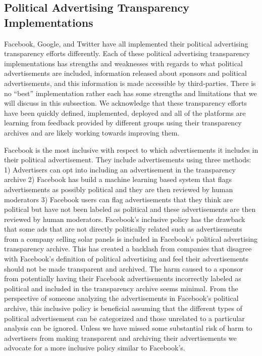 \documentclass[fleqn,10pt]{wlscirep}
\begin{document}
\subsection*{Political Advertising Transparency Implementations}

Facebook, Google, and Twitter have all implemented their political advertising transparency efforts differently. Each of these political advertising transparency implementations has strengths and weaknesses with regards to what political advertisements are included, information released about sponsors and political advertisements, and this information is made accessible by third-parties. There is no ``best'' implementation rather each has some strengths and limitations that we will discuss in this subsection. We acknowledge that these transparency efforts have been quickly defined, implemented, deployed and all of the platforms are learning from feedback provided by different groups using their transparency archives and are likely working towards improving them.

Facebook is the most inclusive with respect to which advertisements it includes in their political advertisement. They include advertisements using three methods: 1) Advertisers can opt into including an advertisement in the transparency archive 2) Facebook has build a machine learning based system that flags advertisements as possibly political and they are then reviewed by human moderators 3) Facebook users can flag advertisements that they think are political but have not been labeled as political and these advertisements are then reviewed by human moderators. Facebook's inclusive policy has the drawback that some ads that are not directly politically related such as advertisements from a company selling solar panels is included in Facebook's political advertising transparency archive. This has created a backlash from companies that disagree with Facebook's definition of political advertising and feel their advertisements should not be made transparent and archived. The harm caused to a sponsor from potentially having their Facebook advertisements incorrectly labeled as political and included in the transparency archive seems minimal. From the perspective of someone analyzing the advertisements in Facebook's political archive, this inclusive policy is beneficial assuming that the different types of political advertisement can be categorized and those unrelated to a particular analysis can be ignored. Unless we have missed some substantial risk of harm to advertisers from making transparent and archiving their advertisements we advocate for a more inclusive policy similar to Facebook's.
\end{document}

